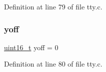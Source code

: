 Definition at line 79 of file tty.\+c.

\mbox{\label{a00173_a1a7539764d0ae8cd06ce45c62cf92bca_a1a7539764d0ae8cd06ce45c62cf92bca}} 
\subsubsection{\texorpdfstring{yoff}{yoff}}
{\footnotesize\ttfamily \hyperlink{a00134_a273cf69d639a59973b6019625df33e30_a273cf69d639a59973b6019625df33e30}{uint16\+\_\+t} yoff = 0}



Definition at line 80 of file tty.\+c.

